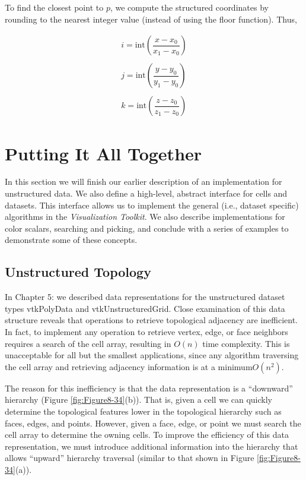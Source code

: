 To find the closest point to $p$, we compute the structured coordinates by rounding to the nearest integer value (instead of using the floor function). Thus,

\begin{equation}\label{eq:8.31}
\begin{array}{lll}
i = \text{int}\left( \dfrac{x-x_0}{x_1 - x_0} \right) \\ \\
j = \text{int}\left( \dfrac{y-y_0}{y_1 - y_0} \right) \\ \\
k = \text{int}\left( \dfrac{z-z_0}{z_1 - z_0} \right)
\end{array}
\end{equation}

\section{Putting It All Together}

In this section we will finish our earlier description of an implementation for unstructured data. We also define a high-level, abstract interface for cells and datasets. This interface allows us to implement the general (i.e., dataset specific) algorithms in the \emph{Visualization Toolkit}. We also describe
implementations for color scalars, searching and picking, and conclude with a series of examples to demonstrate some of these concepts.

\subsection{Unstructured Topology}

In Chapter 5:  we described data representations for the unstructured dataset types vtkPolyData and vtkUnstructuredGrid. Close examination of this data structure reveals that operations to retrieve topological adjacency are inefficient. In fact, to implement any operation to retrieve vertex, edge, or face neighbors requires a search of the cell array, resulting in $O(n)$ time complexity. This is unacceptable for all but the smallest applications, since any algorithm traversing the cell array and retrieving adjacency information is at a minimum$ O(n^2)$.

The reason for this inefficiency is that the data representation is a ``downward'' hierarchy (Figure \ref{fig:Figure8-34}(b)). That is, given a cell we can quickly determine the topological features lower in the topological hierarchy such as faces, edges, and points. However, given a face, edge, or point we must search the cell array to determine the owning cells. To improve the efficiency of this data representation, we must introduce additional information into the hierarchy that allows ``upward'' hierarchy traversal (similar to that shown in Figure \ref{fig:Figure8-34}(a)).


